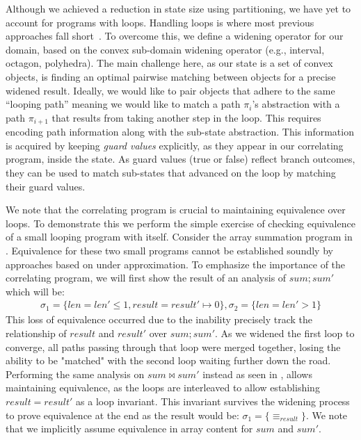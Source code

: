  Although we achieved a reduction in state size using partitioning, we have yet to account for programs with loops. Handling loops is where most previous approaches fall short~\cite{GodlinStrichman09,KawaguchiLahiriRebelo10,DwyerElbaumPerson08,EnglerRamos11}. To overcome this, we define a widening operator for our domain, based on the convex sub-domain widening operator (e.g., interval, octagon, polyhedra). The main challenge here, as our state is a set of convex objects, is finding an optimal pairwise matching between objects for a precise widened result. Ideally, we would like to pair objects that adhere to the same ``looping path'' meaning we would like to match a path $\pi_i$'s abstraction with a path $\pi_{i+1}$ that results from taking another step in the loop. This requires encoding path information along with the sub-state abstraction. This information is acquired by keeping \emph{guard values} explicitly, as they appear in our correlating program, inside the state. As guard values (true or false) reflect branch outcomes, they can be used to match sub-states that advanced on the loop by matching their guard values.

We note that the correlating program is crucial to maintaining equivalence over loops. To demonstrate this we perform the simple exercise of checking equivalence of a small looping program with itself. Consider the array summation program in . Equivalence for these two small programs cannot be established soundly by approaches based on under approximation. To emphasize the importance of the correlating program, we will first show the result of an analysis of $sum;sum'$ which will be:
{\footnotesize
\[
\begin{array}{c}
\sigma_1 = \{len = len' \leq 1, result = result' \mapsto 0\},
\sigma_2 = \{len = len' > 1\}
\end{array}
\]
}
This loss of equivalence occurred due to the inability precisely track the relationship of $result$ and $result'$ over $sum;sum'$. As we widened the first loop to converge, all paths passing through that loop were merged together, losing the ability to be "matched" with the second loop waiting further down the road. Performing the same analysis on $sum \bowtie sum'$ instead as seen in , allows maintaining equivalence, as the loops are interleaved to allow establishing $result = result'$ as a loop invariant. This invariant survives the widening process to prove equivalence at the end as the result would be:
{\footnotesize $\sigma_1 = \{\equiv_{result}\}$}.
We note that we implicitly assume equivalence in array content for $sum$ and $sum'$.


